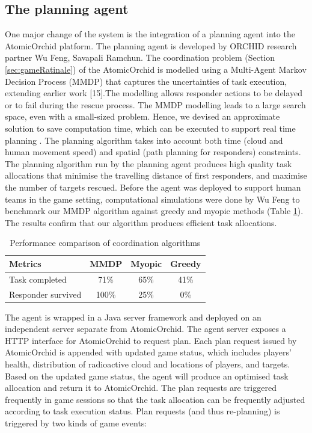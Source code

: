 \subsection{The planning agent}\label{sec:studyoneagent}
One major change of the system is the integration of a planning agent into the AtomicOrchid platform. The planning agent is developed by ORCHID research partner Wu Feng, Savapali Ramchun. The coordination problem (Section \ref{sec:gameRatinale}) of the AtomicOrchid is modelled using a Multi-Agent Markov Decision Process (MMDP) that captures the uncertainties of task execution, extending earlier work [15].The modelling allows responder actions to be delayed or to fail during the rescue process. The MMDP modelling leads to a large search space, even with a small-sized problem. Hence, we devised an approximate solution to save computation time, which can be executed to support real time planning \cite{Wu2015}. The planning algorithm takes into account both time (cloud and human movement speed) and spatial (path planning for responders) constraints. The planning algorithm run by the planning agent produces high quality task allocations that minimise the travelling distance of first responders, and maximise the number of targets rescued. Before the agent was deployed to support human teams in the game setting, computational simulations were done by Wu Feng to benchmark our MMDP algorithm against greedy and myopic methods (Table  \ref{tab:alg}). The results confirm that our algorithm produces efficient task allocations.\\

\begin{table}[h]
\footnotesize
\centering
\begin{tabular}{l|ccc}
Metrics            & \multicolumn{1}{l}{MMDP} & \multicolumn{1}{l}{Myopic} & \multicolumn{1}{l}{Greedy} \\ \hline
Task completed     & 71\%                     & 65\%                       & 41\%                       \\
Responder survived & 100\%                    & 25\%                       & 0\%                       
\end{tabular}
\caption{Performance comparison of coordination algorithms}
\label{tab:alg}
\end{table}

The agent is wrapped in a Java server framework and deployed on an independent server separate from AtomicOrchid. The agent server exposes a HTTP interface for AtomicOrchid to request plan. Each plan request issued by AtomicOrchid is appended with  updated game status, which includes players' health, distribution of radioactive cloud and locations of players, and targets. Based on the updated game status, the agent will produce an optimised task allocation and return it to AtomicOrchid. The plan requests are triggered frequently in game sessions so that the task allocation can be frequently adjusted according to task execution status. Plan requests (and thus re-planning) is triggered by two kinds of game events:\\


